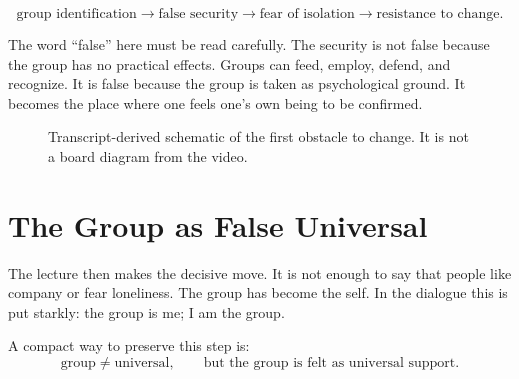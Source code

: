 \begin{equation}
\text{group identification}
\longrightarrow
\text{false security}
\longrightarrow
\text{fear of isolation}
\longrightarrow
\text{resistance to change}.
\end{equation}

The word ``false'' here must be read carefully. The security is not false because the group has no practical effects. Groups can feed, employ, defend, and recognize. It is false because the group is taken as psychological ground. It becomes the place where one feels one's own being to be confirmed.

\begin{figure}
\centering
{}

Transcript-derived schematic of the first obstacle to change. It is not a board diagram from the video.
\end{figure}

\section{The Group as False Universal}

The lecture then makes the decisive move. It is not enough to say that people like company or fear loneliness. The group has become the self. In the dialogue this is put starkly: the group is me; I am the group.

A compact way to preserve this step is:
\begin{equation}
\text{group} \neq \text{universal},
\qquad
\text{but the group is felt as universal support}.
\end{equation}

